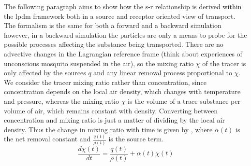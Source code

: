 The following paragraph aims to show how the s-r relationship is derived within the \acrshort{lpdm} framework both in a source and receptor oriented view of transport. The formalism is the same for both a forward and a backward simulation however, in a backward simulation the particles are only a means to probe for the possible processes affecting the substance being transported. There are no advective changes in the Lagrangian reference frame (think about experiences of unconscious mosquito suspended in the air), so the mixing ratio $\chi$ of the tracer is only affected by the sources $q$ and any linear removal process proportional to $\chi$. We consider the tracer mixing ratio rather than concentration, since concentration depends on the local air density, which changes with temperature and pressure, whereas the mixing ratio $\chi$ is the volume of a trace substance per volume of air, which remains constant with density. Converting between concentration and mixing ratio is just a matter of dividing by the local air density. Thus the change in mixing ratio with time is given by , where $\alpha(t)$ is the net removal constant and $\frac{q(t)}{\rho(t)}$ is the source term. 
\begin{equation}\label{eq:mix_ratio_lagr}
    \frac{d \chi(t)}{dt} = \frac{q(t)}{\rho(t)} + \alpha(t)\chi(t)
\end{equation}

